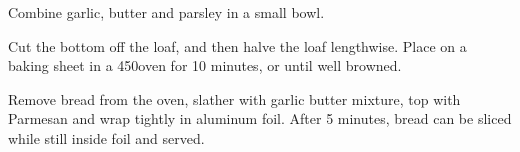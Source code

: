 \begin{recipe}

Combine garlic, butter and parsley in a small bowl.


Cut the bottom off the loaf, and then halve the loaf lengthwise. Place on a baking sheet in a 450\degree oven for 10 minutes, or until well browned.


Remove bread from the oven, slather with garlic butter mixture, top with Parmesan and wrap tightly in aluminum foil.
After 5 minutes, bread can be sliced while still inside foil and served.

\end{recipe}
